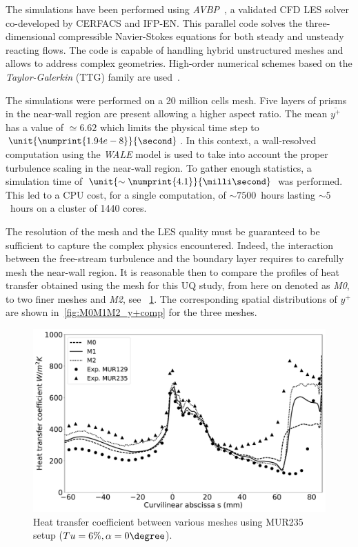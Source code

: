 The simulations have been performed using \textit{AVBP}~\cite{Gicquel2011}, a validated CFD LES solver co-developed by CERFACS and IFP-EN. This parallel code solves the three-dimensional compressible Navier-Stokes equations for both steady and unsteady reacting flows. The code is capable of handling hybrid unstructured meshes and allows to address complex geometries. High-order numerical schemes based on the \textit{Taylor-Galerkin} (TTG) family are used~\cite{Quartapelle1993}. 

The simulations were performed on a 20 million cells mesh. Five layers of prisms in the near-wall region are present allowing a higher aspect ratio. The mean $\overline{y^+}$ has a value of $\simeq 6.62$ which limits the physical time step to $\unit{\numprint{1.94e-8}}{\second}$. In this context, a wall-resolved computation using the \textit{WALE} \cite{Nicoud1999} model is used to take into account the proper turbulence scaling in the near-wall region. To gather enough statistics, a simulation time of $\unit{\sim\numprint{4.1}}{\milli\second}$ was performed. This led to a CPU cost, for a single computation, of $\sim7500$~hours lasting $\sim5$~hours on a cluster of 1440 cores.

The resolution of the mesh and the LES quality must be guaranteed to be sufficient to capture the complex physics encountered. Indeed, the interaction between the free-stream turbulence and the boundary layer requires to carefully mesh the near-wall region. It is reasonable then to compare the profiles of heat transfer obtained using the mesh for this UQ study, from here on denoted as \textit{M0}, to two finer meshes  and \textit{M2}, see ~\cref{fig:M0M1M2_hcomp}. The corresponding spatial distributions of ${y^+}$ are shown in~\cref{fig:M0M1M2_y+comp} for the three meshes.

\begin{figure}[!h]
\centering
\includegraphics[width=0.8\linewidth,keepaspectratio]{fig/applications/ls89/Heatflux_M0M1M2_comp.pdf}
\caption{Heat transfer coefficient between various meshes using MUR235 setup ($Tu=6\%, \alpha = 0\degree$).}
\label{fig:M0M1M2_hcomp}
\end{figure}

